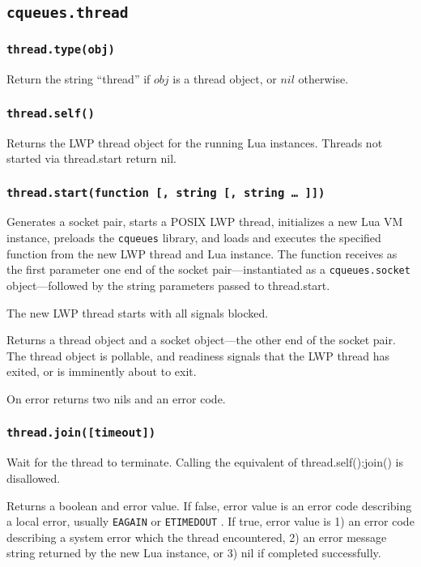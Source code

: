 \documentclass[11pt, oneside]{memoir}
\newcommand{\cqueues}[0]{\texttt{cqueues} }
\newcommand{\routine}[1]{\texttt{#1} }
\newcommand{\fn}[1]{\texttt{#1} }
\newcommand{\module}[1]{\texttt{#1} }
\newcommand{\errno}[1]{\texttt{#1} }
\newcounter{toccols}
\newenvironment{Module}[1]{
	\subsection{\texttt{#1}}
	\addtocontents{toc}{
		\protect\begin{multicols}{\value{toccols}}
	}
}{
	\addtocontents{toc}{\protect\end{multicols}}
}
\begin{document}
\begin{Module}{cqueues.thread}

\subsubsection[\routine{thread.type}]{\routine{thread.type(obj)}}
Return the string ``thread'' if $obj$ is a thread object, or $nil$ otherwise.

\subsubsection[\fn{thread.self}]{\fn{thread.self()}}
Returns the LWP thread object for the running Lua instances. Threads not started via thread.start return nil.

\subsubsection[\fn{thread.start}]{\fn{thread.start(function [, string [, string … ]])}}
Generates a socket pair, starts a POSIX LWP thread, initializes a new Lua VM instance, preloads the \cqueues library, and loads and executes the specified function from the new LWP thread and Lua instance. The function receives as the first parameter one end of the socket pair---instantiated as a \module{cqueues.socket} object---followed by the string parameters passed to thread.start.

The new LWP thread starts with all signals blocked.

Returns a thread object and a socket object---the other end of the socket pair. The thread object is pollable, and readiness signals that the LWP thread has exited, or is imminently about to exit.

On error returns two nils and an error code.

\subsubsection[\fn{thread:join}]{\fn{thread.join([timeout])}}
Wait for the thread to terminate. Calling the equivalent of thread.self():join() is disallowed.

Returns a boolean and error value. If false, error value is an error code describing a local error, usually \errno{EAGAIN} or \errno{ETIMEDOUT}. If true, error value is 1) an error code describing a system error which the thread encountered, 2) an error message string returned by the new Lua instance, or 3) nil if completed successfully.

\end{Module}
\end{document}
